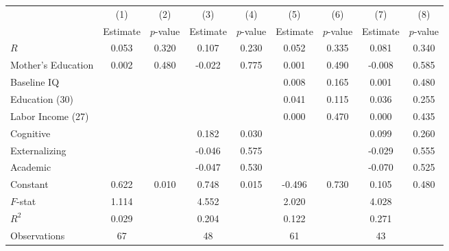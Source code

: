 \begin{tabular}{lcccccccc} \toprule
 & (1) & (2) & (3) & (4) & (5) & (6) & (7) & (8) \\ 
 & Estimate  & $p$-value  & Estimate  & $p$-value  & Estimate  & $p$-value  & Estimate  & $p$-value  \\  \midrule
$R$ &     0.053 &     0.320 &     0.107 &     0.230 &     0.052 &     0.335 &     0.081 &     0.340 \\  
Mother's Education &     0.002 &     0.480 &    -0.022 &     0.775 &     0.001 &     0.490 &    -0.008 &     0.585 \\  
Baseline IQ &         &         &         &         &     0.008 &     0.165 &     0.001 &     0.480 \\  
Education (30) &         &         &         &         &     0.041 &     0.115 &     0.036 &     0.255 \\  
Labor Income (27) &         &         &         &         &     0.000 &     0.470 &     0.000 &     0.435 \\  
Cognitive &         &         &     0.182 &     0.030 &         &         &     0.099 &     0.260 \\  
Externalizing &         &         &    -0.046 &     0.575 &         &         &    -0.029 &     0.555 \\  
Academic &         &         &    -0.047 &     0.530 &         &         &    -0.070 &     0.525 \\  
Constant &     0.622 &     0.010 &     0.748 &     0.015 &    -0.496 &     0.730 &     0.105 &     0.480 \\  \midrule
$F$-stat &     1.114 &         &     4.552 &         &     2.020 &         &     4.028 &         \\  
$R^2$ &     0.029 &         &     0.204 &         &     0.122 &         &     0.271 &         \\  
Observations &    67 &         &    48 &         &    61 &         &    43 &         \\  
\bottomrule
\end{tabular}

